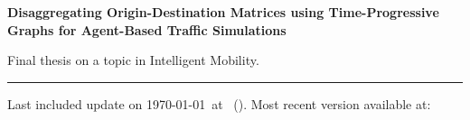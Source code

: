 \documentclass[12pt,a4paper,ragged2e,withhyper]{altacv} %
\begin{document}
\begin{paracol}{2}

\medskip



\textbf{Disaggregating Origin-Destination Matrices
using Time-Progressive Graphs for Agent-Based Traffic Simulations}

Final thesis on a topic in Intelligent Mobility.

\smallskip

   

\smallskip





\end{paracol}

\vfill
\hrule
\medskip
\small{
    Last included update on \today~at \DTMcurrenttime~(\DTMcurrentzone).
    Most recent version available at: 
}
\end{document}
